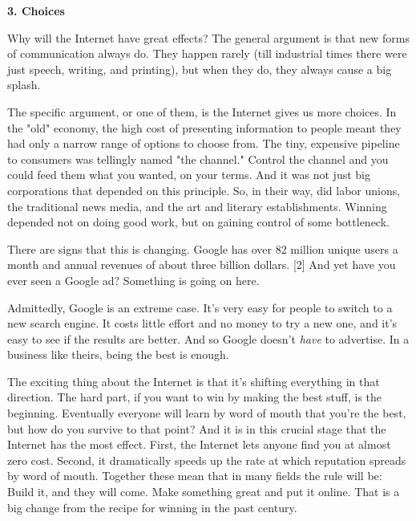 \textbf{3. Choices}

Why will the Internet have great effects? The
                  general argument is that new forms of communication always do.
                  They happen rarely (till industrial times there were just
                  speech, writing, and printing), but when they do, they always
                  cause a big splash.

The specific argument, or one
                  of them, is the Internet gives us more choices. In the "old"
                  economy, the high cost of presenting information to people
                  meant they had only a narrow range of options to choose from.
                  The tiny, expensive pipeline to consumers was tellingly named
                  "the channel." Control the channel and you could feed them
                  what you wanted, on your terms. And it was not just big
                  corporations that depended on this principle. So, in their
                  way, did labor unions, the traditional news media, and the art
                  and literary establishments. Winning depended not on doing
                  good work, but on gaining control of some bottleneck.

There
                  are signs that this is changing. Google has over 82 million
                  unique users a month and annual revenues of about three
                  billion dollars. [2] And yet have you ever seen a Google ad?
                  Something is going on here.

Admittedly, Google is
                  an extreme case. It's very easy for people to switch to a new
                  search engine. It costs little effort and no money to try a
                  new one, and it's easy to see if the results are better. And
                  so Google doesn't \emph{have} to advertise. In a business like
                  theirs, being the best is enough.

The exciting
                  thing about the Internet is that it's shifting everything in
                  that direction. The hard part, if you want to win by making
                  the best stuff, is the beginning. Eventually everyone will
                  learn by word of mouth that you're the best, but how do you
                  survive to that point? And it is in this crucial stage that
                  the Internet has the most effect. First, the Internet lets
                  anyone find you at almost zero cost. Second, it dramatically
                  speeds up the rate at which reputation spreads by word of
                  mouth. Together these mean that in many fields the rule will
                  be: Build it, and they will come. Make something great and put
                  it online. That is a big change from the recipe for winning in
                  the past century.

